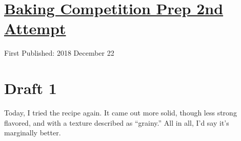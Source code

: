 \documentclass[12pt]{article}[titlepage]
\newcommand{\say}[1]{``#1''}
\newcommand{\1}{\={a}}
\newcommand{\2}{\={e}}
\newcommand{\3}{\={\i}}
\newcommand{\4}{\=o}
\newcommand{\5}{\=u}
\newcommand{\6}{\={A}}
\renewcommand{\,}{\textsuperscript{,}}
\begin{document}
\doublespacing
\section{\href{baking-take-two.html}{Baking Competition Prep 2nd Attempt}}
First Published: 2018 December 22
\section{Draft 1}
Today, I tried the recipe again.
It came out more solid, though less strong flavored, and with a texture described as \say{grainy.}
All in all, I'd say it's marginally better.
\end{document}
